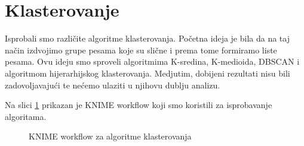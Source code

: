 \section{Klasterovanje}
\label{sec:Klasterovanje}

Isprobali smo razli\v{c}ite algoritme klasterovanja. Po\v{c}etna ideja je bila da na taj na\v{c}in izdvojimo grupe pesama koje su sli\v{c}ne i prema tome formiramo liste pesama. Ovu ideju smo sproveli algoritmima K-sredina, K-medioida, DBSCAN i algoritmom hijerarhijskog klasterovanja. Medjutim, dobijeni rezultati nisu bili zadovoljavaju\'c{}i te ne\'c{}emo ulaziti u njihovu dublju analizu.

Na slici \ref{fig:knime-klasterovanje} prikazan je KNIME workflow koji smo koristili za isprobavanje algoritama.

\begin{figure}[H]
    \centering
    \caption{KNIME workflow za algoritme klasterovanja}
    \label{fig:knime-klasterovanje}
\end{figure}
